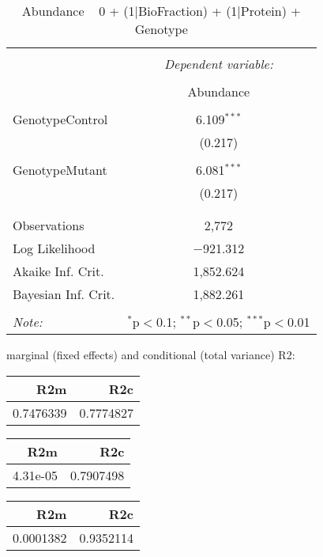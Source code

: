 \documentclass[11pt]{report}
\begin{document}
\begin{table}[!htbp] \centering 
  \caption{Abundance ~ 0 + (1|BioFraction) + (1|Protein) + Genotype} 
  \label{} 
\begin{tabular}{@{\extracolsep{5pt}}lc} 
\\[-1.8ex]\hline 
\hline \\[-1.8ex] 
 & \multicolumn{1}{c}{\textit{Dependent variable:}} \\ 
\cline{2-2} 
\\[-1.8ex] & Abundance \\ 
\hline \\[-1.8ex] 
 GenotypeControl & 6.109$^{***}$ \\ 
  & (0.217) \\ 
  & \\ 
 GenotypeMutant & 6.081$^{***}$ \\ 
  & (0.217) \\ 
  & \\ 
\hline \\[-1.8ex] 
Observations & 2,772 \\ 
Log Likelihood & $-$921.312 \\ 
Akaike Inf. Crit. & 1,852.624 \\ 
Bayesian Inf. Crit. & 1,882.261 \\ 
\hline 
\hline \\[-1.8ex] 
\textit{Note:}  & \multicolumn{1}{r}{$^{*}$p$<$0.1; $^{**}$p$<$0.05; $^{***}$p$<$0.01} \\ 
\end{tabular} 
\end{table} 
marginal (fixed effects) and conditional (total variance) R2:

\begin{tabular}{r|r}
\hline
R2m & R2c\\
\hline
0.7476339 & 0.7774827\\
\hline
\end{tabular}

\begin{tabular}{r|r}
\hline
R2m & R2c\\
\hline
4.31e-05 & 0.7907498\\
\hline
\end{tabular}

\begin{tabular}{r|r}
\hline
R2m & R2c\\
\hline
0.0001382 & 0.9352114\\
\hline
\end{tabular}
\end{document}
